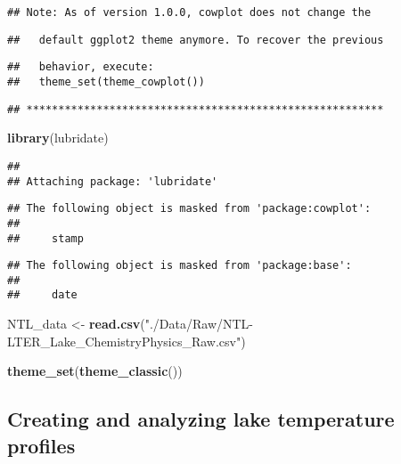 \documentclass[]{article}
\newenvironment{Shaded}{\begin{snugshade}}{\end{snugshade}}
\newcommand{\KeywordTok}[1]{\textcolor[rgb]{0.13,0.29,0.53}{\textbf{#1}}}
\newcommand{\NormalTok}[1]{#1}
\newcommand{\StringTok}[1]{\textcolor[rgb]{0.31,0.60,0.02}{#1}}
\begin{document}
\begin{verbatim}
## Note: As of version 1.0.0, cowplot does not change the
\end{verbatim}

\begin{verbatim}
##   default ggplot2 theme anymore. To recover the previous
\end{verbatim}

\begin{verbatim}
##   behavior, execute:
##   theme_set(theme_cowplot())
\end{verbatim}

\begin{verbatim}
## ********************************************************
\end{verbatim}

\begin{Shaded}
\begin{Highlighting}[]
\KeywordTok{library}\NormalTok{(lubridate)}
\end{Highlighting}
\end{Shaded}

\begin{verbatim}
## 
## Attaching package: 'lubridate'
\end{verbatim}

\begin{verbatim}
## The following object is masked from 'package:cowplot':
## 
##     stamp
\end{verbatim}

\begin{verbatim}
## The following object is masked from 'package:base':
## 
##     date
\end{verbatim}

\begin{Shaded}
\begin{Highlighting}[]
\NormalTok{NTL_data <-}\StringTok{ }\KeywordTok{read.csv}\NormalTok{(}\StringTok{"./Data/Raw/NTL-LTER_Lake_ChemistryPhysics_Raw.csv"}\NormalTok{)}

\KeywordTok{theme_set}\NormalTok{(}\KeywordTok{theme_classic}\NormalTok{())}
\end{Highlighting}
\end{Shaded}

\hypertarget{creating-and-analyzing-lake-temperature-profiles}{%
\subsection{Creating and analyzing lake temperature
profiles}\label{creating-and-analyzing-lake-temperature-profiles}}
\end{document}
